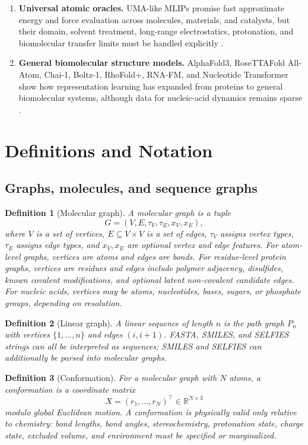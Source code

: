\documentclass[11pt]{article}
\newtheorem{definition}{Definition}
\newcommand{\R}{\mathbb{R}}
\begin{document}
\begin{enumerate}[leftmargin=2em]
  \item \textbf{Universal atomic oracles.} UMA-like MLIPs promise fast approximate energy and force evaluation across molecules, materials, and catalysts, but their domain, solvent treatment, long-range electrostatics, protonation, and biomolecular transfer limits must be handled explicitly \cite{wood2025uma}.
  \item \textbf{General biomolecular structure models.} AlphaFold3, RoseTTAFold All-Atom, Chai-1, Boltz-1, RhoFold+, RNA-FM, and Nucleotide Transformer show how representation learning has expanded from proteins to general biomolecular systems, although data for nucleic-acid dynamics remains sparse \cite{abramson2024af3,krishna2024rfaa,chaiteam2024chai1,wohlwend2024boltz1,shen2024rhofold,dallatorre2024nt}.
\end{enumerate}

\section{Definitions and Notation}

\subsection{Graphs, molecules, and sequence graphs}

\begin{definition}[Molecular graph]
A molecular graph is a tuple
\[
G=(V,E,\tau_V,\tau_E,x_V,x_E),
\]
where $V$ is a set of vertices, $E\subseteq V\times V$ is a set of edges, $\tau_V$ assigns vertex types, $\tau_E$ assigns edge types, and $x_V,x_E$ are optional vertex and edge features. For atom-level graphs, vertices are atoms and edges are bonds. For residue-level protein graphs, vertices are residues and edges include polymer adjacency, disulfides, known covalent modifications, and optional latent non-covalent candidate edges. For nucleic acids, vertices may be atoms, nucleotides, bases, sugars, or phosphate groups, depending on resolution.
\end{definition}

\begin{definition}[Linear graph]
A linear sequence of length $n$ is the path graph $P_n$ with vertices $\{1,\dots,n\}$ and edges $(i,i+1)$. FASTA, SMILES, and SELFIES strings can all be interpreted as sequences; SMILES and SELFIES can additionally be parsed into molecular graphs.
\end{definition}

\begin{definition}[Conformation]
For a molecular graph with $N$ atoms, a conformation is a coordinate matrix
\[
X=(r_1,\dots,r_N)^\top\in\R^{N\times 3}
\]
modulo global Euclidean motion. A conformation is physically valid only relative to chemistry: bond lengths, bond angles, stereochemistry, protonation state, charge state, excluded volume, and environment must be specified or marginalized.
\end{definition}
\end{document}

